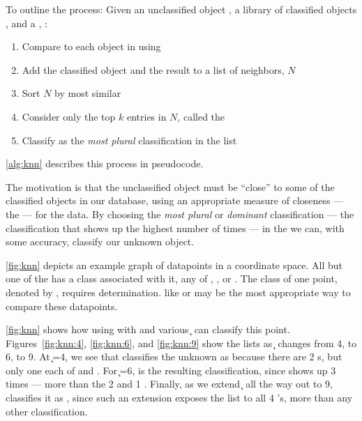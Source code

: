 To outline the process:
Given an unclassified object \UNKNOWN{}, a library of classified objects \LIB{}, and a \compfunc{}, \COMP{}:
\begin{enumerate}
\item Compare \UNKNOWN{} to each object in \LIB{} using \COMP{}
\item Add the classified object and the result to a list of neighbors, $N$
\item Sort $N$ by most similar
\item Consider only the top $k$ entries in $N$, called the \knnlong{} \label{knn:filter}
\item Classify \UNKNOWN{} as the \textit{most plural} classification in the \knnlong{} list
\end{enumerate}
\autoref{alg:knn} describes this process in pseudocode.




The motivation is that the unclassified object must be ``close'' to some of the classified objects in our database, using an appropriate measure of closeness --- the \textit{\compfunc{}} --- for the data. 
\index{\compfunc{}}
By choosing the \textit{most plural} or \textit{dominant} classification --- the classification that shows up the highest number of times ---  in the \knnlong{} we can, with some accuracy, classify our unknown object.

\autoref{fig:knn} depicts an example graph of datapoints in a coordinate space. 
All but one of the has a class associated with it, any of \achar{}, \bchar{}, or \cchar{}. 
The class of one point, denoted by \unknownchar{}, requires determination. 
\Compfuncs{} like \euclid{} or \manhattan{} may be the most appropriate way to compare these datapoints.

\autoref{fig:knn} shows how using \kNN{} with \euclid{} and various \k{} can classify this point.
Figures~\ref{fig:knn:4}, \ref{fig:knn:6}, and \ref{fig:knn:9} show the \knnlong{} lists as \k{} changes from 4, to 6, to 9.
At \k{}=4, we see that \kNN{} classifies the unknown as \achar{} because there are 2 \achar{}s, but only one each of \bchar{} and \cchar{}.
For \k{}=6, \bchar{} is the resulting classification, since \bchar{} shows up 3 times --- more than the 2 \achar{} and 1 \cchar{}.
Finally, as we extend \k{} all the way out to 9, \kNN{} classifies it as \cchar{}, since such an extension exposes the \knnlong{} list to all 4 \cchar{}'s, more than any other classification.
